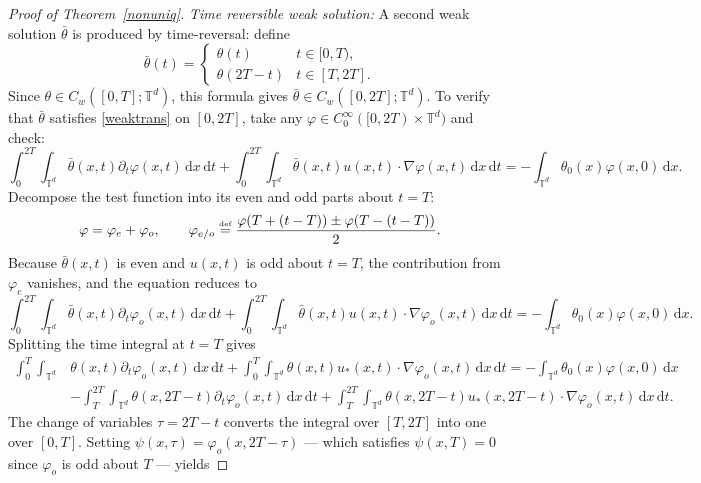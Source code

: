 \documentclass[12pt]{report}   %
\newcommand{\defeq}{\stackrel{\scriptscriptstyle\textup{def}}{=}}
\numberwithin{equation}{section}
\theoremstyle{plain}
\theoremstyle{definition}
\theoremstyle{remark}
\newcommand{\rmd}{\, \mathrm{d}}
\begin{document}
\begin{proof}[Proof of Theorem~\ref{nonuniq}]
 \emph{Time reversible weak solution:}
  A second weak solution $\bar{\theta}$ is produced by time-reversal: define
    \begin{equation}
 \bar \theta(t) =
  \begin{cases} \theta(t) & t\in [0,T),\\
  \theta(2T-t) & t\in [T,2T].
  \end{cases}
  \end{equation}
  Since $\theta\in C_w([0,T]; \mathbb{T}^d)$, this formula gives $\bar\theta\in C_w([0,2T]; \mathbb{T}^d)$.
   To verify that $\bar\theta$ satisfies \eqref{weaktrans} on $[0,2T]$, take any $\varphi \in C^\infty_0([0, 2T)\times \mathbb{T}^d)$ and check:
   \begin{equation}
\int_0^{2T} \int_{\mathbb{T}^d}  \bar\theta (x,t) \partial_t \varphi(x,t)  \rmd x \rmd t+ \int_0^{2T} \int_{\mathbb{T}^d} \bar\theta (x,t)u(x,t)  \cdot \nabla \varphi(x,t)  \rmd x \rmd t =  -\int_{\mathbb{T}^d} \theta_0 (x)  \varphi(x,0)  \rmd x .
\end{equation}
Decompose the test function into its even and odd parts about $t=T$:
\begin{equation}
\varphi = \varphi_{e} + \varphi_{o}, \qquad \varphi_{e/o}\defeq \frac{ \varphi(T + (t-T)) \pm  \varphi(T - (t-T))}{2}.
\end{equation}
Because $\bar\theta(x,t)$ is even and $u(x,t)$ is odd about $t=T$, the contribution from $\varphi_e$ vanishes, and the equation reduces to 
   \begin{equation}
\int_0^{2T} \int_{\mathbb{T}^d}  \bar\theta (x,t) \partial_t \varphi_o(x,t)  \rmd x \rmd t+ \int_0^{2T} \int_{\mathbb{T}^d} \bar\theta (x,t)u(x,t)  \cdot \nabla \varphi_o(x,t)  \rmd x \rmd t =  -\int_{\mathbb{T}^d} \theta_0 (x)  \varphi(x,0)  \rmd x .
\end{equation}
Splitting the time integral at $t = T$ gives
   \begin{align}\nonumber
   \int_0^{T} \int_{\mathbb{T}^d}& \theta (x,t) \partial_t \varphi_o(x,t)  \rmd x \rmd t+ \int_0^{T} \int_{\mathbb{T}^d} \theta (x,t)u_*(x,t)  \cdot \nabla \varphi_o(x,t)  \rmd x \rmd t =  -\int_{\mathbb{T}^d} \theta_0 (x)  \varphi(x,0)  \rmd x\\ \nonumber
      &-\int_{T}^{2T}  \int_{\mathbb{T}^d} \theta (x,2T-t) \partial_t \varphi_o(x,t)  \rmd x \rmd t+ \int_{T}^{2T} \int_{\mathbb{T}^d} \theta (x,2T-t)u_*(x,2T-t) \cdot \nabla \varphi_o(x,t)  \rmd x \rmd t.
   \end{align}
The change of variables $\tau = 2T - t$ converts the integral over $[T,2T]$ into one over $[0,T]$. Setting $\psi(x,\tau) = \varphi_o(x, 2T-\tau)$ — which satisfies $\psi(x,T)=0$ since $\varphi_o$ is odd about $T$ — yields

\end{proof}
\end{document}

